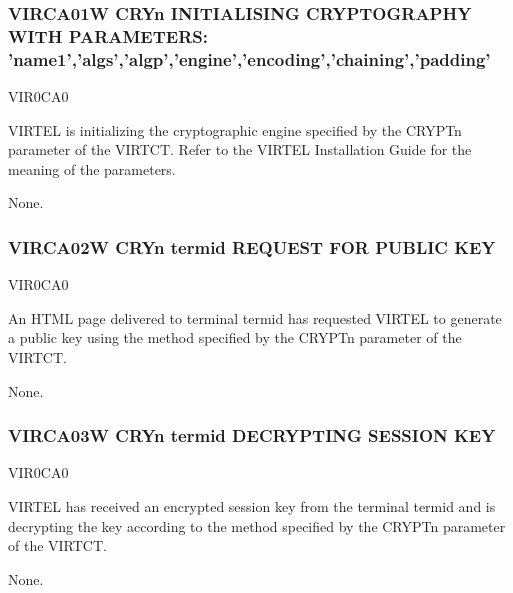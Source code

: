 \documentclass[letterpaper,10pt,english]{sphinxmanual}
\begin{document}
\subsubsection{VIRCA01W CRYn INITIALISING CRYPTOGRAPHY WITH PARAMETERS: ’name1’,’algs’,’algp’,’engine’,’encoding’,’chaining’,’padding’}
\label{\detokenize{messages:virca01w-cryn-initialising-cryptography-with-parameters-name1-algs-algp-engine-encoding-chaining-padding}}\begin{description}
\sphinxAtStartPar
VIR0CA0

\sphinxAtStartPar
VIRTEL is initializing the cryptographic engine specified by the CRYPTn parameter of the VIRTCT. Refer to the VIRTEL Installation Guide for the meaning of the parameters.

\sphinxAtStartPar
None.

\end{description}


\subsubsection{VIRCA02W CRYn termid REQUEST FOR PUBLIC KEY}
\label{\detokenize{messages:virca02w-cryn-termid-request-for-public-key}}\begin{description}
\sphinxAtStartPar
VIR0CA0

\sphinxAtStartPar
An HTML page delivered to terminal termid has requested VIRTEL to generate a public key using the method specified by the CRYPTn parameter of the VIRTCT.

\sphinxAtStartPar
None.

\end{description}


\subsubsection{VIRCA03W CRYn termid DECRYPTING SESSION KEY}
\label{\detokenize{messages:virca03w-cryn-termid-decrypting-session-key}}\begin{description}
\sphinxAtStartPar
VIR0CA0

\sphinxAtStartPar
VIRTEL has received an encrypted session key from the terminal termid and is decrypting the key according to the method specified by the CRYPTn parameter of the VIRTCT.

\sphinxAtStartPar
None.

\end{description}
\end{document}
